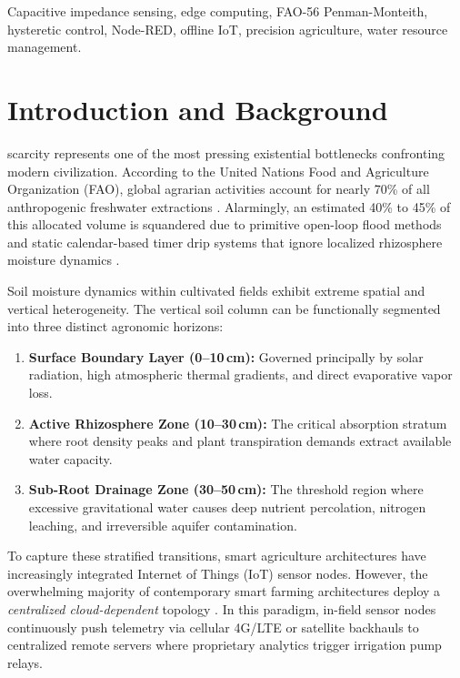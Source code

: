 \documentclass[journal,10pt,twocolumn]{IEEEtran}
\begin{document}
\begin{IEEEkeywords}
Capacitive impedance sensing, edge computing, FAO-56 Penman-Monteith, hysteretic control, Node-RED, offline IoT, precision agriculture, water resource management.
\end{IEEEkeywords}

\section{Introduction and Background}
 scarcity represents one of the most pressing existential bottlenecks confronting modern civilization. According to the United Nations Food and Agriculture Organization (FAO), global agrarian activities account for nearly 70\% of all anthropogenic freshwater extractions \cite{allen1998crop}. Alarmingly, an estimated 40\% to 45\% of this allocated volume is squandered due to primitive open-loop flood methods and static calendar-based timer drip systems that ignore localized rhizosphere moisture dynamics \cite{vellidis2016smart, jha2019comprehensive}.

Soil moisture dynamics within cultivated fields exhibit extreme spatial and vertical heterogeneity. The vertical soil column can be functionally segmented into three distinct agronomic horizons:
\begin{enumerate}
    \item \textbf{Surface Boundary Layer (0--10\,cm):} Governed principally by solar radiation, high atmospheric thermal gradients, and direct evaporative vapor loss.
    \item \textbf{Active Rhizosphere Zone (10--30\,cm):} The critical absorption stratum where root density peaks and plant transpiration demands extract available water capacity.
    \item \textbf{Sub-Root Drainage Zone (30--50\,cm):} The threshold region where excessive gravitational water causes deep nutrient percolation, nitrogen leaching, and irreversible aquifer contamination.
\end{enumerate}

To capture these stratified transitions, smart agriculture architectures have increasingly integrated Internet of Things (IoT) sensor nodes. However, the overwhelming majority of contemporary smart farming architectures deploy a \textit{centralized cloud-dependent} topology \cite{navarro2020systematic}. In this paradigm, in-field sensor nodes continuously push telemetry via cellular 4G/LTE or satellite backhauls to centralized remote servers where proprietary analytics trigger irrigation pump relays. 
\end{document}
